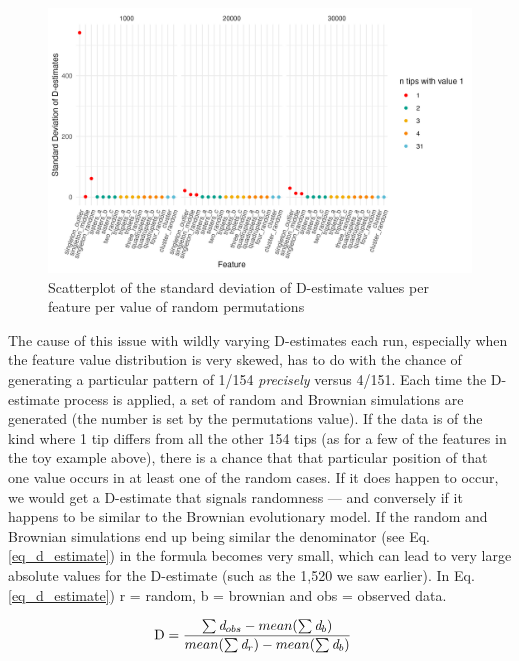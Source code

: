 \documentclass[12pt,letterpaper]{article}
\begin{document}
\begin{figure}[!ht]
\centering
\includegraphics[width=14cm]{illustrations/plots_from_R/phylo_d_sd_permut.png}
\caption{Scatterplot of the standard deviation of D-estimate values per feature per value of random permutations}
\label{fig:phylo_d_plot_sd}
\end{figure}

The cause of this issue with wildly varying D-estimates each run, especially when the feature value distribution is very skewed, has to do with the chance of generating a particular pattern of 1/154 \emph{precisely} versus 4/151. Each time the D-estimate process is applied, a set of random and Brownian simulations are generated (the number is set by the permutations value). If the data is of the kind where 1 tip differs from all the other 154 tips (as for a few of the features in the toy example above), there is a chance that that particular position of that one value occurs in at least one of the random cases. If it does happen to occur, we would get a D-estimate that signals randomness --- and conversely if it happens to be similar to the Brownian evolutionary model. If the random and Brownian simulations end up being similar the denominator (see Eq. \ref{eq_d_estimate}) in the formula becomes very small, which can lead to very large absolute values for the D-estimate (such as the 1,520 we saw earlier). In Eq. \ref{eq_d_estimate}) \citep{fritz2010selectivity} r = random, b = brownian and obs = observed data.

\begin{align}
\label{eq_d_estimate}
    \text{D} 
         &=  \frac{\sum\emph{d}_{obs} - mean(\sum\emph{d}_{b})} {mean(\sum\emph{d}_{r}) - mean(\sum\emph{d}_{b})}
\end{align}
\end{document}

